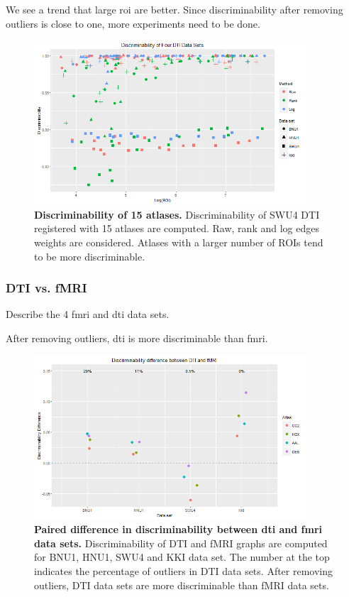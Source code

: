 \documentclass{article}
\begin{document}
 We see a trend that large roi are better. Since discriminability after removing outliers is close to one, more experiments need to be done.

\begin{figure}[ht!]
	\includegraphics[width=4.0in]{../Figs/four_dti.png}
	\caption{{ \bf Discriminability of 15 atlases.} Discriminability of SWU4 DTI registered with 15 atlases are computed. Raw, rank and log edges weights are considered. Atlases with a larger number of ROIs tend to be more discriminable.}
	\label{fig:7}
\end{figure}

\subsubsection{DTI vs. fMRI}
 Describe the 4 fmri and dti data sets.

 After removing outliers, dti is more discriminable than fmri.

\begin{figure}[ht!]
	\includegraphics[width=4.0in]{../Figs/dti_mri_differ.png}
	\caption{{ \bf Paired difference in discriminability between dti and fmri data sets.} Discriminability of DTI and fMRI graphs are computed for BNU1, HNU1, SWU4 and KKI data set. The number at the top indicates the percentage of outliers in DTI data sets. After removing outliers, DTI data sets are more discriminable than fMRI data sets.}
	\label{fig:7}
\end{figure}
\end{document}
